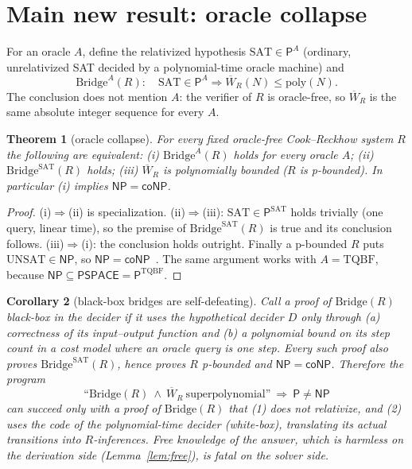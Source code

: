 \documentclass[11pt]{article}
\newtheorem{theorem}{Theorem}
\newtheorem{corollary}[theorem]{Corollary}
\theoremstyle{definition}
\newcommand{\SAT}{\mathrm{SAT}}
\newcommand{\UNSAT}{\mathrm{UNSAT}}
\newcommand{\Wb}{\overline W}
\begin{document}
\section{Main new result: oracle collapse}
For an oracle $A$, define the relativized hypothesis $\SAT\in\mathsf P^A$
(ordinary, unrelativized SAT decided by a polynomial-time oracle machine) and
\[
 \mathrm{Bridge}^A(R):\quad \SAT\in\mathsf P^A\Longrightarrow \Wb_R(N)\le\mathrm{poly}(N).
\]
The conclusion does not mention $A$: the verifier of $R$ is oracle-free, so $\Wb_R$ is the same
absolute integer sequence for every $A$.

\begin{theorem}[oracle collapse]\label{thm:collapse}
For every fixed oracle-free Cook--Reckhow system $R$ the following are equivalent:
(i) $\mathrm{Bridge}^A(R)$ holds for every oracle $A$;
(ii) $\mathrm{Bridge}^{\SAT}(R)$ holds;
(iii) $\Wb_R$ is polynomially bounded ($R$ is p-bounded).
In particular (i) implies $\mathsf{NP}=\mathsf{coNP}$.
\end{theorem}
\begin{proof}
(i)$\Rightarrow$(ii) is specialization. (ii)$\Rightarrow$(iii): $\SAT\in\mathsf P^{\SAT}$ holds
trivially (one query, linear time), so the premise of $\mathrm{Bridge}^{\SAT}(R)$ is true and its
conclusion follows. (iii)$\Rightarrow$(i): the conclusion holds outright.
Finally a p-bounded $R$ puts $\UNSAT\in\mathsf{NP}$, so $\mathsf{NP}=\mathsf{coNP}$~\cite{CR79}. The
same argument works with $A=\mathrm{TQBF}$, because $\mathsf{NP}\subseteq\mathsf{PSPACE}=\mathsf P^{\mathrm{TQBF}}$.
\end{proof}

\begin{corollary}[black-box bridges are self-defeating]\label{cor:dichotomy}
Call a proof of $\mathrm{Bridge}(R)$ \emph{black-box in the decider} if it uses the hypothetical
decider $D$ only through (a) correctness of its input--output function and (b) a polynomial bound on
its step count in a cost model where an oracle query is one step. Every such proof also proves
$\mathrm{Bridge}^{\SAT}(R)$, hence proves $R$ p-bounded and $\mathsf{NP}=\mathsf{coNP}$.
Therefore the program
\[
 \text{``}\mathrm{Bridge}(R)\ \wedge\ \Wb_R\ \text{superpolynomial''}\ \Longrightarrow\ \mathsf P\ne\mathsf{NP}
\]
can succeed only with a proof of $\mathrm{Bridge}(R)$ that (1) does not relativize, and (2) uses
the \emph{code} of the polynomial-time decider (white-box), translating its actual transitions into
$R$-inferences. Free knowledge of the answer, which is harmless on the derivation side (Lemma~\ref{lem:free}),
is fatal on the solver side.
\end{corollary}
\end{document}
